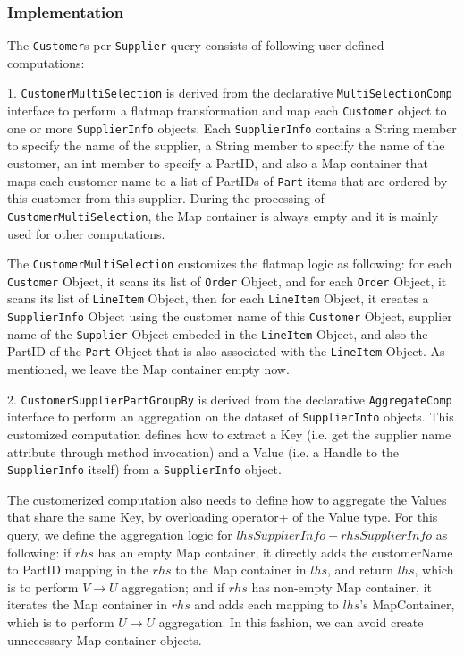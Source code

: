 \subsubsection{Implementation}
The \texttt{Customer}s per \texttt{Supplier} query consists of
following user-defined computations:  

\vspace{5pt}
1. \texttt{CustomerMultiSelection} is derived from the
declarative \texttt{MultiSelectionComp} interface to perform a flatmap
transformation and map each \texttt{Customer} object to one or more
\texttt{SupplierInfo} objects. Each \texttt{SupplierInfo} contains a
String member to specify the name of the supplier, a String member to
specify the name of the customer, an int member to specify a PartID, and
also a Map container that maps each customer name to a list of PartIDs
of \texttt{Part} items that are
ordered by this customer from this supplier. During the processing of
\texttt{CustomerMultiSelection}, the Map container is always empty and
it is mainly used for other computations.

The
\texttt{CustomerMultiSelection} customizes the flatmap logic as
following: for each \texttt{Customer} Object, it scans its list of
\texttt{Order} Object, and for each \texttt{Order} Object, it scans
its list of \texttt{LineItem} Object, then for each \texttt{LineItem}
Object, it creates a \texttt{SupplierInfo} Object using the customer
name of this \texttt{Customer} Object, supplier name of the
\texttt{Supplier} Object embeded in the \texttt{LineItem} Object, and
also the PartID of the \texttt{Part} Object that is also associated with
the \texttt{LineItem} Object. As mentioned, we leave the Map container
empty now.

\vspace{5pt}
2. \texttt{CustomerSupplierPartGroupBy} is derived from the declarative
\texttt{AggregateComp} interface to perform an aggregation on the
dataset of \texttt{SupplierInfo} objects. This customized computation
defines how to extract a Key (i.e. get the supplier name attribute
through method invocation) and a Value (i.e. a Handle to the \texttt{SupplierInfo} itself) from a
\texttt{SupplierInfo} object. 

The customerized computation also needs
to define how to aggregate the Values that share the same Key,  by
overloading operator+ of the Value type. For this query, we define the aggregation
logic for $lhsSupplierInfo + rhsSupplierInfo$ as following: if
$rhs$ has an empty Map container, it directly adds the
customerName to PartID mapping in the $rhs$ to the Map container in $lhs$, and
return $lhs$, which is to perform $V \rightarrow U$ aggregation;
and if $rhs$ has non-empty Map container, it iterates the Map
container in $rhs$ and adds each mapping to $lhs$'s MapContainer,
which is to perform $U \rightarrow U$ aggregation. In this fashion, we can
avoid create unnecessary Map container objects.

